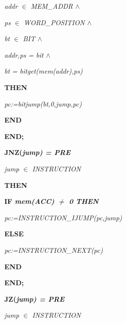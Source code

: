 \begin{sloppypar}
\hspace*{0.30in}\it addr $\in$  \it MEM\_ADDR  $\land$ 

\hspace*{0.30in}\it ps $\in$  \it WORD\_POSITION  $\land$ 

\hspace*{0.30in}\it bt $\in$  \it BIT  $\land$ 

\hspace*{0.30in}\it addr\rm ,\it ps \rm = \it bit  $\land$ 

\hspace*{0.30in}\it bt \rm = \it bitget\rm (\it mem\rm (\it addr\rm )\rm ,\it ps\rm )

\hspace*{0.20in}\bf THEN

\hspace*{0.30in}\it pc\rm :=\it bitjump\rm (\it bt\rm ,\rm 0\rm ,\it jump\rm ,\it pc\rm )

\hspace*{0.20in}\bf END

\hspace*{0.10in}\bf END\rm ;

\hspace*{0.10in}\bf JNZ\rm (\it jump\rm ) \rm = \bf PRE

\hspace*{0.20in}\it jump $\in$  \it INSTRUCTION

\hspace*{0.10in}\bf THEN

\hspace*{0.20in}\bf IF \it mem\rm (\it ACC\rm ) $\not =$ \rm 0 \bf THEN

\hspace*{0.30in}\it pc\rm :=\it INSTRUCTION\_IJUMP\rm (\it pc\rm ,\it jump\rm )

\hspace*{0.20in}\bf ELSE

\hspace*{0.30in}\it pc\rm :=\it INSTRUCTION\_NEXT\rm (\it pc\rm )

\hspace*{0.20in}\bf END

\hspace*{0.10in}\bf END\rm ;

\hspace*{0.10in}\bf JZ\rm (\it jump\rm ) \rm = \bf PRE

\hspace*{0.20in}\it jump $\in$  \it INSTRUCTION


\end{sloppypar}
